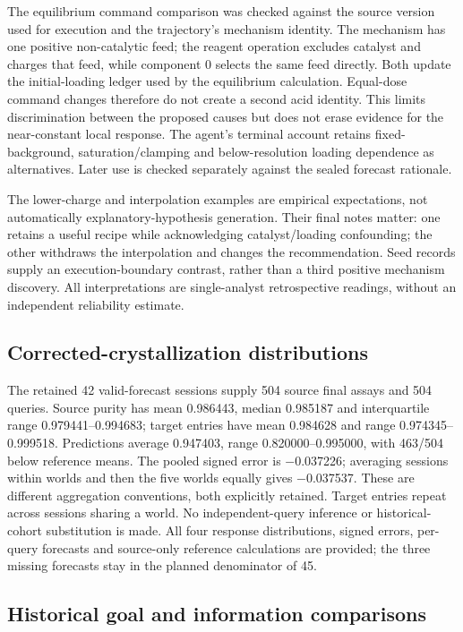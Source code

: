 \documentclass[10pt,a4paper]{article}
\begin{document}
The equilibrium command comparison was checked against the source version used for execution and the trajectory's mechanism identity. The mechanism has one positive non-catalytic feed; the reagent operation excludes catalyst and charges that feed, while component 0 selects the same feed directly. Both update the initial-loading ledger used by the equilibrium calculation. Equal-dose command changes therefore do not create a second acid identity. This limits discrimination between the proposed causes but does not erase evidence for the near-constant local response. The agent's terminal account retains fixed-background, saturation/clamping and below-resolution loading dependence as alternatives. Later use is checked separately against the sealed forecast rationale.

The lower-charge and interpolation examples are empirical expectations, not automatically explanatory-hypothesis generation. Their final notes matter: one retains a useful recipe while acknowledging catalyst/loading confounding; the other withdraws the interpolation and changes the recommendation. Seed records supply an execution-boundary contrast, rather than a third positive mechanism discovery. All interpretations are single-analyst retrospective readings, without an independent reliability estimate.

\subsection{Corrected-crystallization distributions}\label{corrected-crystallization-distributions}

The retained 42 valid-forecast sessions supply 504 source final assays and 504 queries. Source purity has mean 0.986443, median 0.985187 and interquartile range 0.979441--0.994683; target entries have mean 0.984628 and range 0.974345--0.999518. Predictions average 0.947403, range 0.820000--0.995000, with 463/504 below reference means. The pooled signed error is −0.037226; averaging sessions within worlds and then the five worlds equally gives −0.037537. These are different aggregation conventions, both explicitly retained. Target entries repeat across sessions sharing a world. No independent-query inference or historical-cohort substitution is made. All four response distributions, signed errors, per-query forecasts and source-only reference calculations are provided; the three missing forecasts stay in the planned denominator of 45.

\subsection{Historical goal and information comparisons}\label{historical-goal-and-information-comparisons}
\end{document}
